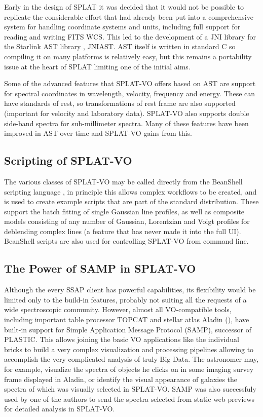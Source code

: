\documentclass[final,authoryear,5p,times,twocolumn]{elsarticle}
\begin{document}
Early in the design of SPLAT it was decided that it would not be possible to
replicate the considerable effort that had already been put into a
comprehensive system for handling coordinate systems and units, including full
support for reading and writing FITS WCS. This led to the development of a JNI
library for the Starlink AST library \citep{1998ASPC..145...41W}, JNIAST. AST
itself is written in standard C so compiling it on many platforms is
relatively easy, but this remains a portability issue at the heart of SPLAT
limiting one of the initial aims.

Some of the advanced features that SPLAT-VO offers based on AST are support
for spectral coordinates in wavelength, velocity, frequency and energy. These
can have standards of rest, so transformations of rest frame are also
supported (important for velocity and laboratory data). SPLAT-VO also supports
double side-band spectra for sub-millimeter spectra. Many of these features
have been improved in AST over time and SPLAT-VO gains from this.


\subsection{Scripting of SPLAT-VO}

The various classes of SPLAT-VO may be called directly from the BeanShell
scripting language \citep{niemeyer2013learning}, in principle this allows
complex workflows to be created, and is used to create example scripts that
are part of the standard distribution. These support the batch fitting of
single Gaussian line profiles, as well as composite models consisting of any
number of Gaussian, Lorentzian and Voigt profiles for deblending complex lines
(a feature that has never made it into the full UI). BeanShell scripts are
also used for controlling SPLAT-VO from command line.


\subsection{The Power of SAMP in SPLAT-VO}

Although the every SSAP client has  powerful capabilities, its flexibility
would be limited only to the build-in features, probably not suiting all the
requests of a wide spectroscopic community. However, almost all VO-compatible
tools, including important table processor TOPCAT and stellar atlas
Aladin (),
have built-in support for Simple Application Message Protocol (SAMP), successor
of PLASTIC.  This allows joining the basic VO applications like the individual
bricks to build a very complex visualization and processing pipelines allowing
to accomplish the very complicated analysis of truly Big Data.  The astronomer
may, for example, visualize the spectra of objects he clicks on in some imaging
survey frame displayed in Aladin, or identify the visual appearance of galaxies
the spectra of which was visually selected in SPLAT-VO.  SAMP was also successfuly
used by one of the authors to send the spectra selected from   static web
previews for detailed analysis in SPLAT-VO.
\end{document}
